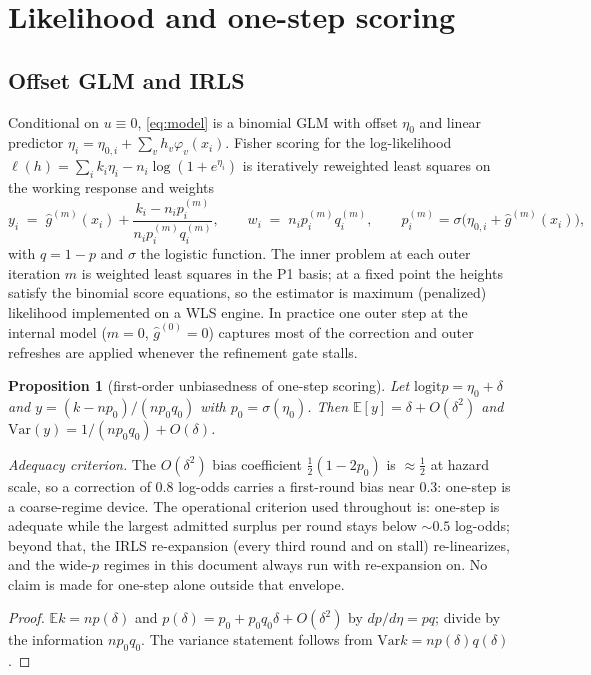 \documentclass[11pt]{article}
\newtheorem{proposition}{Proposition}[section]
\newcommand{\E}{\mathbb{E}}
\newcommand{\Var}{\mathrm{Var}}
\newcommand{\logit}{\mathrm{logit}}
\begin{document}
\section{Likelihood and one-step scoring}\label{sec:glm}

\subsection{Offset GLM and IRLS}
Conditional on $u\equiv 0$, \eqref{eq:model} is a binomial GLM with offset $\eta_0$ and
linear predictor $\eta_i=\eta_{0,i}+\sum_v h_v\varphi_v(x_i)$. Fisher scoring for the
log-likelihood $\ell(h)=\sum_i k_i\eta_i-n_i\log(1+e^{\eta_i})$ is iteratively
reweighted least squares on the working response and weights
\begin{equation}\label{eq:working}
y_i \;=\; \hat g^{(m)}(x_i)+\frac{k_i-n_i p_i^{(m)}}{n_i p_i^{(m)}q_i^{(m)}},
\qquad
w_i \;=\; n_i p_i^{(m)} q_i^{(m)},
\qquad p_i^{(m)}=\sigma\!\bigl(\eta_{0,i}+\hat g^{(m)}(x_i)\bigr),
\end{equation}
with $q=1-p$ and $\sigma$ the logistic function. The inner problem at each outer
iteration $m$ is weighted least squares in the P1 basis; at a fixed point the heights
satisfy the binomial score equations, so the estimator is maximum (penalized) likelihood
implemented on a WLS engine. In practice one outer step at the internal model
($m=0$, $\hat g^{(0)}=0$) captures most of the correction and outer refreshes are
applied whenever the refinement gate stalls.

\begin{proposition}[first-order unbiasedness of one-step scoring]\label{prop:onestep}
Let $\logit p=\eta_0+\delta$ and $y=(k-np_0)/(np_0q_0)$ with $p_0=\sigma(\eta_0)$. Then
$\E[y]=\delta+O(\delta^2)$ and $\Var(y)=1/(np_0q_0)+O(\delta)$.
\end{proposition}

\emph{Adequacy criterion.} The $O(\delta^2)$ bias coefficient
$\tfrac12(1-2p_0)$ is $\approx\tfrac12$ at hazard scale, so a correction of
$0.8$ log-odds carries a first-round bias near $0.3$: one-step is a
coarse-regime device. The operational criterion used throughout is: one-step
is adequate while the largest admitted surplus per round stays below
$\sim0.5$ log-odds; beyond that, the IRLS re-expansion (every third round and
on stall) re-linearizes, and the wide-$p$ regimes in this document always run
with re-expansion on. No claim is made for one-step alone outside that
envelope.
\begin{proof}
$\E k=np(\delta)$ and $p(\delta)=p_0+p_0q_0\delta+O(\delta^2)$ by
$dp/d\eta=pq$; divide by the information $np_0q_0$. The variance statement follows from
$\Var k=np(\delta)q(\delta)$.
\end{proof}
\end{document}

